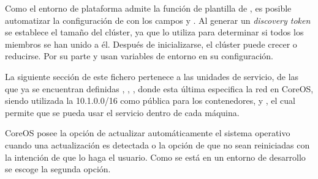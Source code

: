 Como el entorno de plataforma admite la función de plantilla de , es posible automatizar la configuración de  con los campos  y . Al generar un \textit{discovery token} se establece el tamaño del clúster, ya que  lo utiliza para determinar si todos los miembros se han unido a él. Después de inicializarse, el clúster puede crecer o reducirse. Por su parte  y  usan variables de entorno en su configuración.

La siguiente sección de este fichero pertenece a las unidades de servicio, de las que ya se encuentran definidas , , , donde esta última especifica la red en CoreOS, siendo utilizada la 10.1.0.0/16 como pública para los contenedores, y , el cual permite que se pueda usar el servicio  dentro de cada máquina.

CoreOS posee la opción de actualizar automáticamente el sistema operativo cuando una actualización es detectada o la opción de que no sean reiniciadas con la intención de que lo haga el usuario. Como se está en un entorno de desarrollo se escoge la segunda opción.


